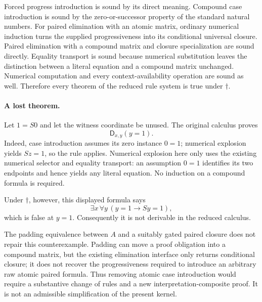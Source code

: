 Forced progress introduction is sound by its direct meaning.
Compound case introduction is sound by the zero-or-successor property
of the standard natural numbers.  For paired elimination with an atomic
matrix, ordinary numerical induction turns the supplied progressiveness
into its conditional universal closure.  Paired elimination with a
compound matrix and closure specialization are sound directly.  Equality
transport is sound because numerical substitution leaves the distinction
between a literal equation and a compound matrix unchanged.  Numerical
computation and every context-availability operation are sound as well.
Therefore every theorem of the reduced rule system is true under
$\dagger$.

\paragraph{A lost theorem.}
Let $1=S0$ and let the witness coordinate be unused.  The original
calculus proves
\[
                   \mathsf D_{x,y}(y=1).
\]
Indeed, case introduction assumes its zero instance $0=1$; numerical
explosion yields $Sz=1$, so the rule applies.  Numerical explosion here
only uses the existing numerical selector and equality transport: an
assumption $0=1$ identifies its two endpoints and hence yields any
literal equation.  No induction on a compound formula is required.

Under $\dagger$, however, this displayed formula says
\[
                   \exists x\,\forall y\,(y=1\to Sy=1),
\]
which is false at $y=1$.  Consequently it is not derivable in the reduced
calculus.

The padding equivalence between $A$ and a suitably gated paired closure
does not repair this counterexample.  Padding can move a proof obligation
into a compound matrix, but the existing elimination interface only
returns conditional closure; it does not recover the progressiveness
required to introduce an arbitrary raw atomic paired formula.
Thus removing atomic case introduction would require a substantive
change of rules and a new interpretation-composite proof.  It is not an
admissible simplification of the present kernel.
